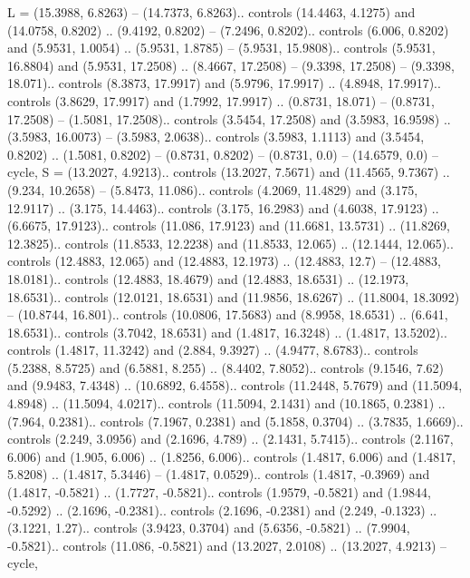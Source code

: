 {L} = {(15.3988, 6.8263) -- (14.7373, 6.8263).. controls (14.4463, 4.1275) and (14.0758, 0.8202) .. (9.4192, 0.8202) -- (7.2496, 0.8202).. controls (6.006, 0.8202) and (5.9531, 1.0054) .. (5.9531, 1.8785) -- (5.9531, 15.9808).. controls (5.9531, 16.8804) and (5.9531, 17.2508) .. (8.4667, 17.2508) -- (9.3398, 17.2508) -- (9.3398, 18.071).. controls (8.3873, 17.9917) and (5.9796, 17.9917) .. (4.8948, 17.9917).. controls (3.8629, 17.9917) and (1.7992, 17.9917) .. (0.8731, 18.071) -- (0.8731, 17.2508) -- (1.5081, 17.2508).. controls (3.5454, 17.2508) and (3.5983, 16.9598) .. (3.5983, 16.0073) -- (3.5983, 2.0638).. controls (3.5983, 1.1113) and (3.5454, 0.8202) .. (1.5081, 0.8202) -- (0.8731, 0.8202) -- (0.8731, 0.0) -- (14.6579, 0.0) -- cycle},
{S} = {(13.2027, 4.9213).. controls (13.2027, 7.5671) and (11.4565, 9.7367) .. (9.234, 10.2658) -- (5.8473, 11.086).. controls (4.2069, 11.4829) and (3.175, 12.9117) .. (3.175, 14.4463).. controls (3.175, 16.2983) and (4.6038, 17.9123) .. (6.6675, 17.9123).. controls (11.086, 17.9123) and (11.6681, 13.5731) .. (11.8269, 12.3825).. controls (11.8533, 12.2238) and (11.8533, 12.065) .. (12.1444, 12.065).. controls (12.4883, 12.065) and (12.4883, 12.1973) .. (12.4883, 12.7) -- (12.4883, 18.0181).. controls (12.4883, 18.4679) and (12.4883, 18.6531) .. (12.1973, 18.6531).. controls (12.0121, 18.6531) and (11.9856, 18.6267) .. (11.8004, 18.3092) -- (10.8744, 16.801).. controls (10.0806, 17.5683) and (8.9958, 18.6531) .. (6.641, 18.6531).. controls (3.7042, 18.6531) and (1.4817, 16.3248) .. (1.4817, 13.5202).. controls (1.4817, 11.3242) and (2.884, 9.3927) .. (4.9477, 8.6783).. controls (5.2388, 8.5725) and (6.5881, 8.255) .. (8.4402, 7.8052).. controls (9.1546, 7.62) and (9.9483, 7.4348) .. (10.6892, 6.4558).. controls (11.2448, 5.7679) and (11.5094, 4.8948) .. (11.5094, 4.0217).. controls (11.5094, 2.1431) and (10.1865, 0.2381) .. (7.964, 0.2381).. controls (7.1967, 0.2381) and (5.1858, 0.3704) .. (3.7835, 1.6669).. controls (2.249, 3.0956) and (2.1696, 4.789) .. (2.1431, 5.7415).. controls (2.1167, 6.006) and (1.905, 6.006) .. (1.8256, 6.006).. controls (1.4817, 6.006) and (1.4817, 5.8208) .. (1.4817, 5.3446) -- (1.4817, 0.0529).. controls (1.4817, -0.3969) and (1.4817, -0.5821) .. (1.7727, -0.5821).. controls (1.9579, -0.5821) and (1.9844, -0.5292) .. (2.1696, -0.2381).. controls (2.1696, -0.2381) and (2.249, -0.1323) .. (3.1221, 1.27).. controls (3.9423, 0.3704) and (5.6356, -0.5821) .. (7.9904, -0.5821).. controls (11.086, -0.5821) and (13.2027, 2.0108) .. (13.2027, 4.9213) -- cycle},
